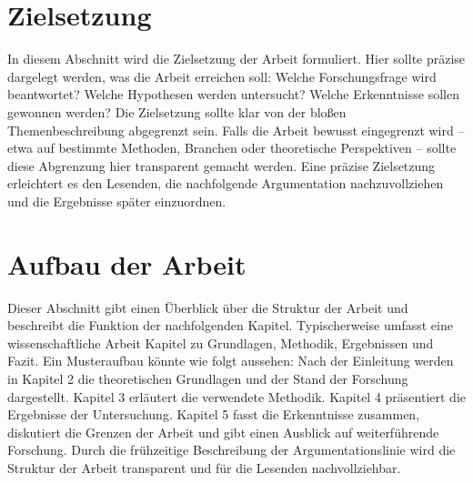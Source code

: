 \section{Zielsetzung}

In diesem Abschnitt wird die Zielsetzung der Arbeit formuliert. Hier sollte präzise dargelegt werden, was die Arbeit erreichen soll: Welche Forschungsfrage wird beantwortet? Welche Hypothesen werden untersucht? Welche Erkenntnisse sollen gewonnen werden?
Die Zielsetzung sollte klar von der bloßen Themenbeschreibung abgegrenzt sein. Falls die Arbeit bewusst eingegrenzt wird – etwa auf bestimmte Methoden, Branchen oder theoretische Perspektiven – sollte diese Abgrenzung hier transparent gemacht werden. Eine präzise Zielsetzung erleichtert es den Lesenden, die nachfolgende Argumentation nachzuvollziehen und die Ergebnisse später einzuordnen.


\section{Aufbau der Arbeit}

Dieser Abschnitt gibt einen Überblick über die Struktur der Arbeit und beschreibt die Funktion der nachfolgenden Kapitel. Typischerweise umfasst eine wissenschaftliche Arbeit Kapitel zu Grundlagen, Methodik, Ergebnissen und Fazit.
Ein Musteraufbau könnte wie folgt aussehen: Nach der Einleitung werden in Kapitel 2 die theoretischen Grundlagen und der Stand der Forschung dargestellt. Kapitel 3 erläutert die verwendete Methodik. Kapitel 4 präsentiert die Ergebnisse der Untersuchung. Kapitel 5 fasst die Erkenntnisse zusammen, diskutiert die Grenzen der Arbeit und gibt einen Ausblick auf weiterführende Forschung.
Durch die frühzeitige Beschreibung der Argumentationslinie wird die Struktur der Arbeit transparent und für die Lesenden nachvollziehbar.


